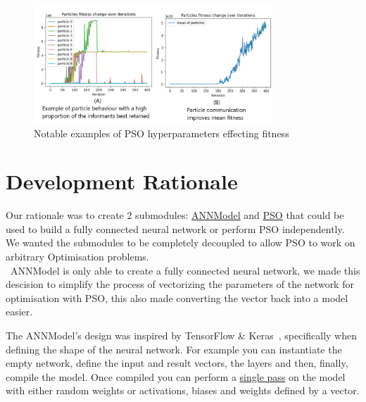 \documentclass[12pt]{article}
\begin{document}
\begin{figure}[H]
    \begin{center}
        \includegraphics[width=0.8\textwidth]{Examples.png} 
    \end{center}
    
    \caption{Notable examples of PSO hyperparameters effecting fitness}
    \label{fig:ExamplePlots}   
\end{figure}

\section{Development Rationale}
Our rationale was to create 2 submodules: \href{https://www2.macs.hw.ac.uk/~sf52/Bio-Comp-docs/html/Coursework.ANNModel.html}{ANNModel} and \href{https://www2.macs.hw.ac.uk/~sf52/Bio-Comp-docs/html/Coursework.PSO.html}{PSO} that could be used to build a fully connected neural network or perform PSO independently.
We wanted the submodules to be completely decoupled to allow PSO to work on arbitrary Optimisation problems.\\

\noindent~ANNModel is only able to create a fully connected neural network, we made this descision to simplify the process of vectorizing the parameters of the network for optimisation with PSO, this also made converting the vector back into a model easier.

The ANNModel’s design was inspired by TensorFlow \& Keras~\autocite{kerasKerasDocumentationModel,tensorflowModuleTfKeras}, specifically when defining the shape of the neural network. For example you can instantiate the empty network, define the input and result vectors, the layers and then, finally, compile the model.
Once compiled you can perform a \href{https://www2.macs.hw.ac.uk/~sf52/Bio-Comp-docs/html/Coursework.ANNModel.html?highlight=one_pass#Coursework.ANNModel.model.ANN.one_pass}{single pass} on the model with either random weights or activations, biases and weights defined by a vector.\\
\end{document}
